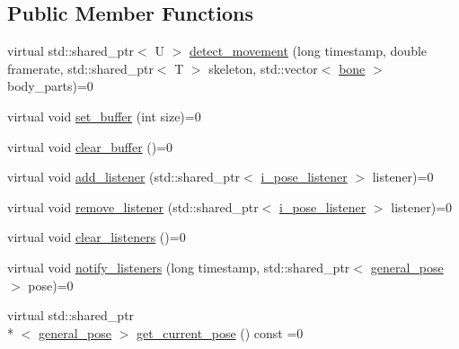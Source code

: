 \subsection*{Public Member Functions}
\begin{DoxyCompactItemize}
\item 
virtual std\-::shared\-\_\-ptr$<$ U $>$ \hyperlink{classmae_1_1i__movement__detector_a7b3e09f127d318b5f794e056e40b3746}{detect\-\_\-movement} (long timestamp, double framerate, std\-::shared\-\_\-ptr$<$ T $>$ skeleton, std\-::vector$<$ \hyperlink{classmae_1_1bone}{bone} $>$ body\-\_\-parts)=0
\item 
virtual void \hyperlink{classmae_1_1i__movement__detector_a96a923c5bab2dbed81daf4cadc885497}{set\-\_\-buffer} (int size)=0
\item 
virtual void \hyperlink{classmae_1_1i__movement__detector_a73db186e7b58daa0923f00b285671172}{clear\-\_\-buffer} ()=0
\item 
virtual void \hyperlink{classmae_1_1i__movement__detector_af6724fa4c8ddb032411825168e4b02d4}{add\-\_\-listener} (std\-::shared\-\_\-ptr$<$ \hyperlink{classmae_1_1i__pose__listener}{i\-\_\-pose\-\_\-listener} $>$ listener)=0
\item 
virtual void \hyperlink{classmae_1_1i__movement__detector_a88d965f2b8d04e0681e2e7cd42bd7331}{remove\-\_\-listener} (std\-::shared\-\_\-ptr$<$ \hyperlink{classmae_1_1i__pose__listener}{i\-\_\-pose\-\_\-listener} $>$ listener)=0
\item 
virtual void \hyperlink{classmae_1_1i__movement__detector_a56a36a8a427feb34f970b9e259a1150f}{clear\-\_\-listeners} ()=0
\item 
virtual void \hyperlink{classmae_1_1i__movement__detector_a347855d153525d7e09f793ff2b17b58b}{notify\-\_\-listeners} (long timestamp, std\-::shared\-\_\-ptr$<$ \hyperlink{classmae_1_1general__pose}{general\-\_\-pose} $>$ pose)=0
\item 
virtual std\-::shared\-\_\-ptr\\*
$<$ \hyperlink{classmae_1_1general__pose}{general\-\_\-pose} $>$ \hyperlink{classmae_1_1i__movement__detector_a67db28512cb293217156fd8611322d75}{get\-\_\-current\-\_\-pose} () const =0
\end{DoxyCompactItemize}


